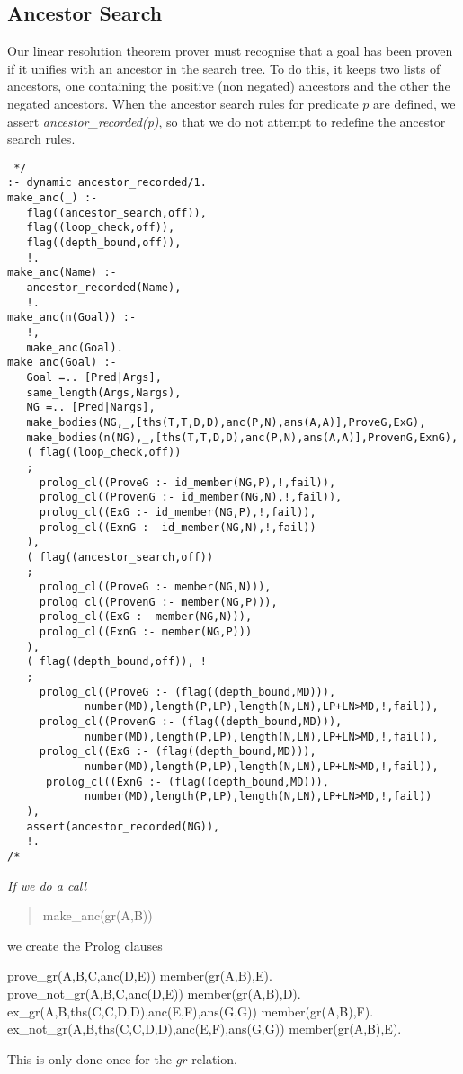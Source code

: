 \subsection{Ancestor Search} \label{anc-section}
Our linear resolution
theorem prover must recognise that a goal has been proven if
it unifies with an ancestor in the search tree. To do this, it keeps
two lists of ancestors, one containing the positive (non negated)
ancestors and the other the negated ancestors.
When the ancestor search rules for predicate $p$ are defined, we assert
{\em ancestor\_recorded(p)}, so that we do not attempt to redefine the
ancestor search rules.
\begin{verbatim} */
:- dynamic ancestor_recorded/1.
make_anc(_) :-
   flag((ancestor_search,off)),
   flag((loop_check,off)),
   flag((depth_bound,off)),
   !.
make_anc(Name) :-
   ancestor_recorded(Name),
   !.
make_anc(n(Goal)) :-
   !,
   make_anc(Goal).
make_anc(Goal) :-
   Goal =.. [Pred|Args],
   same_length(Args,Nargs),
   NG =.. [Pred|Nargs],
   make_bodies(NG,_,[ths(T,T,D,D),anc(P,N),ans(A,A)],ProveG,ExG),
   make_bodies(n(NG),_,[ths(T,T,D,D),anc(P,N),ans(A,A)],ProvenG,ExnG),
   ( flag((loop_check,off))
   ;
     prolog_cl((ProveG :- id_member(NG,P),!,fail)),
     prolog_cl((ProvenG :- id_member(NG,N),!,fail)),
     prolog_cl((ExG :- id_member(NG,P),!,fail)),
     prolog_cl((ExnG :- id_member(NG,N),!,fail))
   ),
   ( flag((ancestor_search,off))
   ;
     prolog_cl((ProveG :- member(NG,N))),
     prolog_cl((ProvenG :- member(NG,P))),
     prolog_cl((ExG :- member(NG,N))),
     prolog_cl((ExnG :- member(NG,P)))
   ),
   ( flag((depth_bound,off)), !
   ;
     prolog_cl((ProveG :- (flag((depth_bound,MD))),
            number(MD),length(P,LP),length(N,LN),LP+LN>MD,!,fail)),
     prolog_cl((ProvenG :- (flag((depth_bound,MD))),
            number(MD),length(P,LP),length(N,LN),LP+LN>MD,!,fail)),
     prolog_cl((ExG :- (flag((depth_bound,MD))),
            number(MD),length(P,LP),length(N,LN),LP+LN>MD,!,fail)),
      prolog_cl((ExnG :- (flag((depth_bound,MD))),
            number(MD),length(P,LP),length(N,LN),LP+LN>MD,!,fail))
   ),
   assert(ancestor_recorded(NG)),
   !.
/* \end{verbatim}

\begin{example} \em
If we do a call
\begin{quote}
make\_anc(gr(A,B))
\end{quote}
we create the Prolog clauses
\begin{prolog}
prove\_gr(A,B,C,anc(D,E))\IF
member(gr(A,B),E).\\
prove\_not\_gr(A,B,C,anc(D,E))\IF
member(gr(A,B),D).\\
ex\_gr(A,B,ths(C,C,D,D),anc(E,F),ans(G,G))\IF
member(gr(A,B),F).\\
ex\_not\_gr(A,B,ths(C,C,D,D),anc(E,F),ans(G,G))\IF
member(gr(A,B),E).
\end{prolog}
This is only done once for the $gr$ relation.
\end{example}

